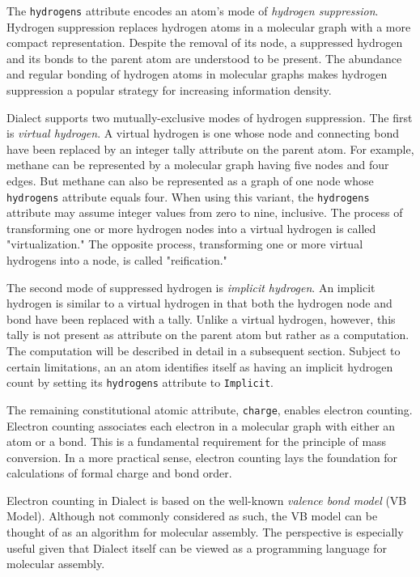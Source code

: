 \documentclass{article}
\def\ttt{\texttt}
\begin{document}
The \ttt{hydrogens} attribute encodes an atom's mode of \textit{hydrogen suppression}. Hydrogen suppression replaces hydrogen atoms in a molecular graph with a more compact representation. Despite the removal of its node, a suppressed hydrogen and its bonds to the parent atom are understood to be present. The abundance and regular bonding of hydrogen atoms in molecular graphs makes hydrogen suppression a popular strategy for increasing information density.

Dialect supports two mutually-exclusive modes of hydrogen suppression. The first is \textit{virtual hydrogen}. A virtual hydrogen is one whose node and connecting bond have been replaced by an integer tally attribute on the parent atom. For example, methane can be represented by a molecular graph having five nodes and four edges. But methane can also be represented as a graph of one node whose \ttt{hydrogens} attribute equals four. When using this variant, the \ttt{hydrogens} attribute may assume integer values from zero to nine, inclusive. The process of transforming one or more hydrogen nodes into a virtual hydrogen is called "virtualization." The opposite process, transforming one or more virtual hydrogens into a node, is called "reification."

The second mode of suppressed hydrogen is \textit{implicit hydrogen}. An implicit hydrogen is similar to a virtual hydrogen in that both the hydrogen node and bond have been replaced with a tally. Unlike a virtual hydrogen, however, this tally is not present as attribute on the parent atom but rather as a computation. The computation will be described in detail in a subsequent section. Subject to certain limitations, an an atom identifies itself as having an implicit hydrogen count by setting its \ttt{hydrogens} attribute to \ttt{Implicit}.

The remaining constitutional atomic attribute, \ttt{charge}, enables electron counting. Electron counting associates each electron in a molecular graph with either an atom or a bond. This is a fundamental requirement for the principle of mass conversion. In a more practical sense, electron counting lays the foundation for calculations of formal charge and bond order.\cite{dietz:1995}

Electron counting in Dialect is based on the well-known \textit{valence bond model} (VB Model).\cite{lewis:1916} Although not commonly considered as such, the VB model can be thought of as an algorithm for molecular assembly. The perspective is especially useful given that Dialect itself can be viewed as a programming language for molecular assembly.
\end{document}
